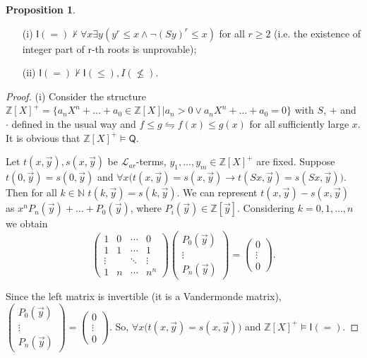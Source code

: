 \documentclass[a4paper,14pt]{article}
\theoremstyle{definition}
\theoremstyle{theorem}
\theoremstyle{lemma}
\theoremstyle{proposition}
\newtheorem{proposition}{Proposition}[section]
\theoremstyle{remark}
\theoremstyle{corollary}
\theoremstyle{problem}
\theoremstyle{hypothesis}
\begin{document}
\begin{proposition}
    \begin{enumerate}
        \item[(i)] $\mathsf I(=) \nvdash \forall x \exists y (y^r \leqslant x \wedge \neg (Sy)^r \leqslant x)$ for all $r \geqslant 2$ (i.e. the existence of integer part of r-th roots is unprovable);
        \item[(ii)] $\mathsf I(=) \nvdash \mathsf I(\leqslant),  I(\nleqslant)$.
    \end{enumerate}
    
\end{proposition}

\begin{proof}
    (i) Consider the structure $\mathbb Z[X]^+ = \{a_n X^n + \dots + a_0 \in \mathbb Z[X]| a_n > 0 \vee a_n X^n + \dots + a_0 = 0\}$ with $S$, $+$ and $\cdot$ defined in the usual way and $f \leqslant g \leftrightharpoons f(x) \leqslant g(x)$ for all sufficiently large $x$. It is obvious that $\mathbb Z[X]^+ \vDash \mathsf Q$. 
    
    Let $t(x, \vec y), s(x, \vec y)$ be $\mathcal L_{ar}$-terms, $y_1, \dots, y_m \in \mathbb Z[X]^+$ are fixed. Suppose $t(0, \vec y) = s(0, \vec y)$ and $\forall x \big(t(x, \vec y) = s(x, \vec y) \rightarrow t(Sx, \vec y) = s(Sx, \vec y)\big)$. Then for all $k \in \mathbb N$ $t(k, \vec y) = s(k, \vec y)$. We can represent $t(x, \vec y) - s(x, \vec y)$ as $x^n P_n(\vec y) + \dots + P_0(\vec y)$, where $P_i(\vec y) \in \mathbb Z[\vec y]$. Considering $k = 0, 1, \dots, n$ we obtain
    $$
    \begin{pmatrix}
    1 & 0 & \cdots & 0 \\
    1 & 1 & \cdots & 1 \\
    \vdots & & \ddots & \vdots \\
    1 & n & \cdots & n^n
    \end{pmatrix}
    \begin{pmatrix}
    P_0(\vec y) \\
    \vdots \\
    P_n(\vec y)
    \end{pmatrix}
    =
    \begin{pmatrix}
    0 \\
    \vdots \\
    0
    \end{pmatrix}.
    $$
    
    Since the left matrix is invertible (it is a Vandermonde matrix), 
    $\begin{pmatrix}
    P_0(\vec y) \\
    \vdots \\
    P_n(\vec y)
    \end{pmatrix}
    =
    \begin{pmatrix}
    0 \\
    \vdots \\
    0
    \end{pmatrix}$. So, $\forall x \big(t(x, \vec y) = s(x, \vec y)\big)$ and $\mathbb Z[X]^+ \vDash \mathsf I (=)$.
    

\end{proof}
\end{document}
